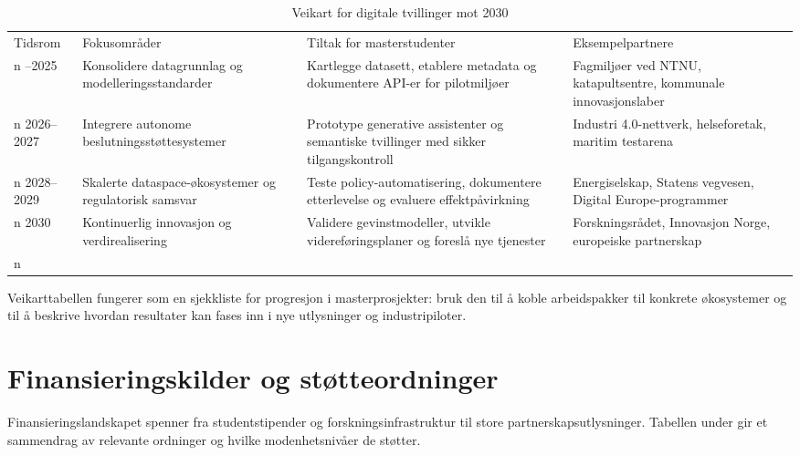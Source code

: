 \begin{table}[h]
    \centering
    \caption{Veikart for digitale tvillinger mot 2030}
    \label{tab:roadmap2030}
    \begin{tabular}{p{2.4cm}p{4.1cm}p{4.1cm}p{3.0cm}}
        \toprule
        Tidsrom & Fokusområder & Tiltak for masterstudenter & Eksempelpartnere \\n        \midrule
        2024--2025 & Konsolidere datagrunnlag og modelleringsstandarder & Kartlegge datasett, etablere metadata og dokumentere API-er for pilotmiljøer & Fagmiljøer ved NTNU, katapultsentre, kommunale innovasjonslaber \\n        2026--2027 & Integrere autonome beslutningsstøttesystemer & Prototype generative assistenter og semantiske tvillinger med sikker tilgangskontroll & Industri 4.0-nettverk, helseforetak, maritim testarena \\n        2028--2029 & Skalerte dataspace-økosystemer og regulatorisk samsvar & Teste policy-automatisering, dokumentere etterlevelse og evaluere effektpåvirkning & Energiselskap, Statens vegvesen, Digital Europe-programmer \\n        2030 & Kontinuerlig innovasjon og verdirealisering & Validere gevinstmodeller, utvikle videreføringsplaner og foreslå nye tjenester & Forskningsrådet, Innovasjon Norge, europeiske partnerskap \\n        \bottomrule
    \end{tabular}
\end{table}

Veikarttabellen fungerer som en sjekkliste for progresjon i masterprosjekter: bruk den til å koble arbeidspakker til konkrete økosystemer og til å beskrive hvordan resultater kan fases inn i nye utlysninger og industripiloter.

\section{Finansieringskilder og støtteordninger}
Finansieringslandskapet spenner fra studentstipender og forskningsinfrastruktur til store partnerskapsutlysninger. Tabellen under gir et sammendrag av relevante ordninger og hvilke modenhetsnivåer de støtter.

